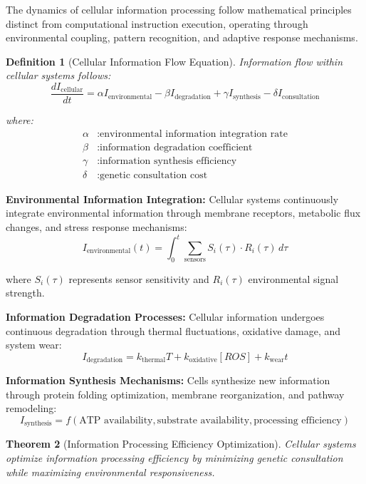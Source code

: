 \documentclass[12pt,a4paper]{article}
\newtheorem{theorem}{Theorem}[section]
\newtheorem{definition}[theorem]{Definition}
\begin{document}
The dynamics of cellular information processing follow mathematical principles distinct from computational instruction execution, operating through environmental coupling, pattern recognition, and adaptive response mechanisms.

\begin{definition}[Cellular Information Flow Equation]
Information flow within cellular systems follows:
$$\frac{dI_{\text{cellular}}}{dt} = \alpha I_{\text{environmental}} - \beta I_{\text{degradation}} + \gamma I_{\text{synthesis}} - \delta I_{\text{consultation}}$$

where:
\begin{align}
\alpha &: \text{environmental information integration rate} \\
\beta &: \text{information degradation coefficient} \\
\gamma &: \text{information synthesis efficiency} \\
\delta &: \text{genetic consultation cost}
\end{align}
\end{definition}

\textbf{Environmental Information Integration:}
Cellular systems continuously integrate environmental information through membrane receptors, metabolic flux changes, and stress response mechanisms:
$$I_{\text{environmental}}(t) = \int_{0}^{t} \sum_{\text{sensors}} S_i(τ) \cdot R_i(τ) \, dτ$$

where $S_i(τ)$ represents sensor sensitivity and $R_i(τ)$ environmental signal strength.

\textbf{Information Degradation Processes:}
Cellular information undergoes continuous degradation through thermal fluctuations, oxidative damage, and system wear:
$$I_{\text{degradation}} = k_{\text{thermal}} T + k_{\text{oxidative}} [ROS] + k_{\text{wear}} t$$

\textbf{Information Synthesis Mechanisms:}
Cells synthesize new information through protein folding optimization, membrane reorganization, and pathway remodeling:
$$I_{\text{synthesis}} = f(\text{ATP availability}, \text{substrate availability}, \text{processing efficiency})$$

\begin{theorem}[Information Processing Efficiency Optimization]
Cellular systems optimize information processing efficiency by minimizing genetic consultation while maximizing environmental responsiveness.
\end{theorem}
\end{document}
